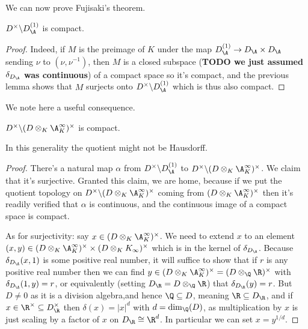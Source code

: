 We can now prove Fujisaki's theorem.

\begin{theorem}
  $D^\times\backslash D_{\A}^{(1)}$ is compact.
\end{theorem}
\begin{proof}
  Indeed, if $M$ is the preimage of $K$ under the map $D_{\A}^{(1)} \to D_{\A}\times D_{\A}$
  sending $\nu$ to $(\nu,\nu^{-1})$, then $M$ is a closed subspace ({\bf TODO we just assumed $\delta_{D_{\A}}$
  was continuous}) of a compact
  space so it's compact, and the previous lemma shows that $M$ surjects onto
  $D^\times\backslash D_{\A}^{(1)}$ which is thus also compact.
\end{proof}

We note here a useful consequence.

\begin{theorem}
  $D^\times\backslash(D\otimes_K\A_K^\infty)^\times$ is compact.
\end{theorem}
\begin{remark} In this generality the quotient might not be Hausdorff.
\end{remark}
\begin{proof}
  There's a natural map $\alpha$ from $D^\times\backslash D_{\A}^{(1)}$ to
  $D^\times\backslash (D\otimes_K \A_K^\infty)^\times$. We claim that it's
  surjective. Granted this claim, we are home, because if we put the quotient
  topology on $D^\times\backslash (D\otimes_K \A_K^\infty)^\times$ coming from
  $(D\otimes_K \A_K^\infty)^\times$ then it's readily verified that $\alpha$
  is continuous, and the continuous image of a compact space is compact.

  As for surjectivity: say $x\in (D\otimes_K \A_K^\infty)^\times$. We need to extend
  $x$ to an element $(x,y)\in (D\otimes_K \A_K^\infty)^\times\times(D\otimes_K K_\infty)^\times$
  which is in the kernel of $\delta_{D_{\A}}$. Because $\delta_{D_{\A}}(x,1)$ is some positive
  real number, it will suffice to show that if $r$ is any positive real number then we can
  find $y\in (D\otimes_K \A_K^\infty)^\times=(D\otimes_{\Q}\R)^\times$ with $\delta_{D_{\A}}(1,y)=r$,
  or equivalently (setting $D_{\R}=D\otimes_{\Q}\R$) that $\delta_{D_{\R}}(y)=r$.
  But $D\not=0$ as it is a division algebra,and hence $\Q\subseteq D$, meaning
  $\R\subseteq D_{\R}$, and if
  $x\in\R^\times\subseteq D_{\R}^\times$ then $\delta(x)=|x|^d$ with $d=\dim_{\Q}(D)$,
  as multiplication by $x$ is just scaling by a factor of $x$ on $D_{\R}\cong\R^d$.
  In particular we can set $x=y^{1/d}$.
\end{proof}
